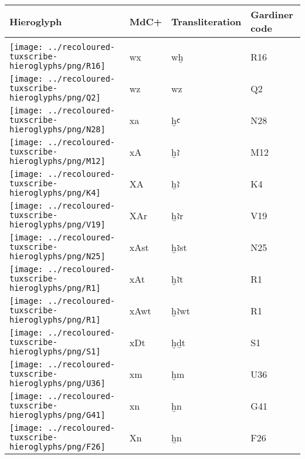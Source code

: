 \begin{center}
	\begin{tabularx}{\linewidth}{YYYY}
		Hieroglyph & MdC+ & Transliteration & Gardiner code\\
		\hline\\
		\texttt{[image: ../recoloured-tuxscribe-hieroglyphs/png/R16]} & wx & wḫ & R16 \\ 
		\texttt{[image: ../recoloured-tuxscribe-hieroglyphs/png/Q2]} & wz & wz & Q2 \\ 
		\texttt{[image: ../recoloured-tuxscribe-hieroglyphs/png/N28]} & xa & ḫꜥ & N28 \\ 
		\texttt{[image: ../recoloured-tuxscribe-hieroglyphs/png/M12]} & xA & ḫꜣ & M12 \\ 
		\texttt{[image: ../recoloured-tuxscribe-hieroglyphs/png/K4]} & XA & ẖꜣ & K4 \\ 
		\texttt{[image: ../recoloured-tuxscribe-hieroglyphs/png/V19]} & XAr & ẖꜣr & V19 \\ 
		\texttt{[image: ../recoloured-tuxscribe-hieroglyphs/png/N25]} & xAst & ḫꜣst & N25 \\ 
		\texttt{[image: ../recoloured-tuxscribe-hieroglyphs/png/R1]} & xAt & ḫꜣt & R1 \\ 
		\texttt{[image: ../recoloured-tuxscribe-hieroglyphs/png/R1]} & xAwt & ḫꜣwt & R1 \\ 
		\texttt{[image: ../recoloured-tuxscribe-hieroglyphs/png/S1]} & xDt & ḫḏt & S1 \\ 
		\texttt{[image: ../recoloured-tuxscribe-hieroglyphs/png/U36]} & xm & ḫm & U36 \\ 
		\texttt{[image: ../recoloured-tuxscribe-hieroglyphs/png/G41]} & xn & ḫn & G41 \\ 
		\texttt{[image: ../recoloured-tuxscribe-hieroglyphs/png/F26]} & Xn & ẖn & F26 \\ 
	\end{tabularx}
\end{center}


